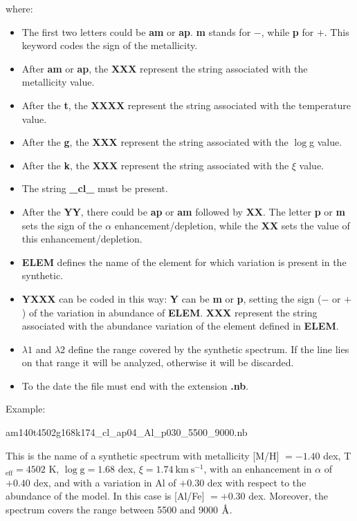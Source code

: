 \documentclass[modern]{aastex701}
\newcommand{\angstrom}{\mbox{\normalfont\AA}}
\begin{document}
where:
\begin{itemize}
    \item The first two letters could be {\bf am} or {\bf ap}. {\bf m} stands for $-$, while {\bf p} for $+$. This keyword codes the sign of the metallicity.
    \item After {\bf am} or {\bf ap}, the {\bf XXX} represent the string associated with the metallicity value. 
    \item After the {\bf t}, the {\bf XXXX} represent the string associated with the temperature value.
    \item After the {\bf g}, the {\bf XXX} represent the string associated with the $\log$g value.
    \item After the {\bf k}, the {\bf XXX} represent the string associated with the $\xi$ value.
    \item The string {\bf \_cl\_} must be present.
    \item After the {\bf YY}, there could be {\bf ap} or {\bf am} followed by {\bf XX}. The letter {\bf p} or {\bf m} sets the sign of the $\alpha$ enhancement/depletion, while the {\bf XX} sets the value of this enhancement/depletion.
    \item {\bf ELEM} defines the name of the element for which variation is present in the synthetic.
    \item {\bf YXXX} can be coded in this way: {\bf Y} can be {\bf m} or {\bf p}, setting the sign ($-$ or $+$) of the variation in abundance of {\bf ELEM}. {\bf XXX} represent the string associated with the abundance variation of the element defined in {\bf ELEM}.
    \item {\bf $\lambda1$} and { \bf $\lambda2$} define the range covered by the synthetic spectrum. If the line lies on that range it will be analyzed, otherwise it will be discarded.
    \item To the date the file must end with the extension {\bf .nb}.
\end{itemize}

Example:
\begin{center}
    am140t4502g168k174\_cl\_ap04\_Al\_p030\_5500\_9000.nb
\end{center}
This is the name of a synthetic spectrum with metallicity [M/H] $= -1.40$ dex, T$_{\mathrm{eff}} = 4502$ K, $\log \mathrm{g} = 1.68$ dex, $\xi = 1.74~\mathrm{km ~s^{-1}}$, with an enhancement in $\alpha$ of $+0.40$ dex, and with a variation in Al of $+0.30$ dex with respect to the abundance of the model. In this case is [Al/Fe] $= +0.30$ dex. Moreover, the spectrum covers the range between 5500 and 9000 $\angstrom$.  
\end{document}
